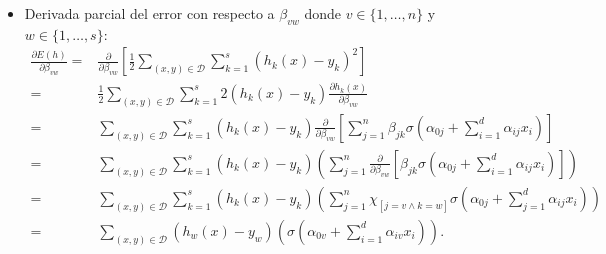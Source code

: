\begin{itemize}
    \item Derivada parcial del error con respecto a $\beta_{v w}$ donde $v \in \{1, \ldots, n\}$ y $w \in \{1, \ldots, s\}$:
    \begin{align} \label{eq:parcial_beta}
        \frac{\partial E(h)}{\partial \beta_{v w}} 
        = &
        \frac{\partial}{\partial \beta_{v w}}
        \left[
            \frac{1}{2}
            \sum_{(x,y) \in \mathcal{D}}
            \sum_{k = 1}^s 
            \left(h_k(x) - y_k \right)^2
        \right]
        \\ %
        = &
        \frac{1}{2}
        \sum_{(x,y) \in \mathcal{D}}
        \sum_{k = 1}^s 
        2 \left(h_k(x) - y_k \right)
        \frac{\partial h_k(x)}{\partial \beta_{v w}} 
        \\ 
        = & %
        \sum_{(x,y) \in \mathcal{D}}
        \sum_{k = 1}^s 
        \left(h_k(x) - y_k \right)
        \frac{\partial}{\partial \beta_{v w}} 
        \left[
            \sum_{j = 1}^n 
                \beta_{j k}
                \sigma
                \left(  
                    \alpha_{0 j} +
                    \sum_{i=1}^d \alpha_{i j}x_i
                \right)
        \right] 
        \\ 
        = & %
        \sum_{(x,y) \in \mathcal{D}}
        \sum_{k = 1}^s 
        \left(h_k(x) - y_k \right)
        \left(
            \sum_{j = 1}^n 
            \frac{\partial}{\partial \beta_{v w}} 
            \left[
                \beta_{j k}
                \sigma
                \left(  
                    \alpha_{0 j} +
                    \sum_{i=1}^d \alpha_{i j}x_i
                \right)
            \right]
        \right) 
        \\ 
        = & %
        \sum_{(x,y) \in \mathcal{D}}
        \sum_{k = 1}^s 
        \left(h_k(x) - y_k \right)
        \left(
            \sum_{j = 1}^n 
                \chi_{[j = v \wedge k = w]}
                \sigma
                \left(  
                    \alpha_{0 j} +
                    \sum_{j=1}^d \alpha_{i j}x_i
                \right)
        \right)
        \\ 
        = & %
        \sum_{(x,y) \in \mathcal{D}}
        \left(h_w(x) - y_w \right)
        \left(
            \sigma
            \left(  
                \alpha_{0 v} +
                \sum_{i=1}^d \alpha_{i v}x_i
            \right)
        \right).
    \end{align}


\end{itemize}
